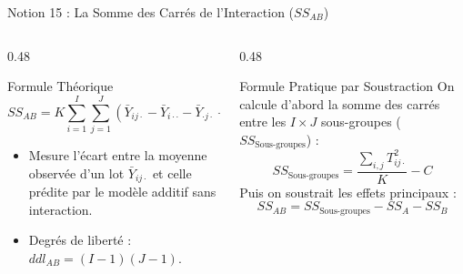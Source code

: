 \documentclass[aspectratio=169,10pt]{beamer}
\begin{document}
\begin{frame}{Notion 15 : La Somme des Carrés de l'Interaction ($SS_{AB}$)}
  \begin{columns}[onlytextwidth, T]
    \begin{column}{0.48\linewidth}
      \begin{conceptbox}{Formule Théorique}
        \begin{equation*}
          SS_{AB} = K \sum_{i=1}^I \sum_{j=1}^J (\bar{Y}_{ij\cdot} - \bar{Y}_{i\cdot\cdot} - \bar{Y}_{\cdot j\cdot} + \bar{Y}_{\dots})^2
        \end{equation*}
        \begin{itemize}
          \item Mesure l'écart entre la moyenne observée d'un lot $\bar{Y}_{ij\cdot}$ et celle prédite par le modèle additif sans interaction.
          \item Degrés de liberté : $ddl_{AB} = (I - 1)(J - 1)$.
        \end{itemize}
      \end{conceptbox}
    \end{column}
    \begin{column}{0.48\linewidth}
      \begin{takeawaybox}{Formule Pratique par Soustraction}
        On calcule d'abord la somme des carrés entre les $I \times J$ sous-groupes ($SS_{\text{Sous-groupes}}$) :
        \begin{equation*}
          SS_{\text{Sous-groupes}} = \frac{\sum_{i, j} T_{ij\cdot}^2}{K} - C
        \end{equation*}
        Puis on soustrait les effets principaux :
        \begin{equation*}
          SS_{AB} = SS_{\text{Sous-groupes}} - SS_A - SS_B
        \end{equation*}
      \end{takeawaybox}
    \end{column}
  \end{columns}
\end{frame}
\end{document}
